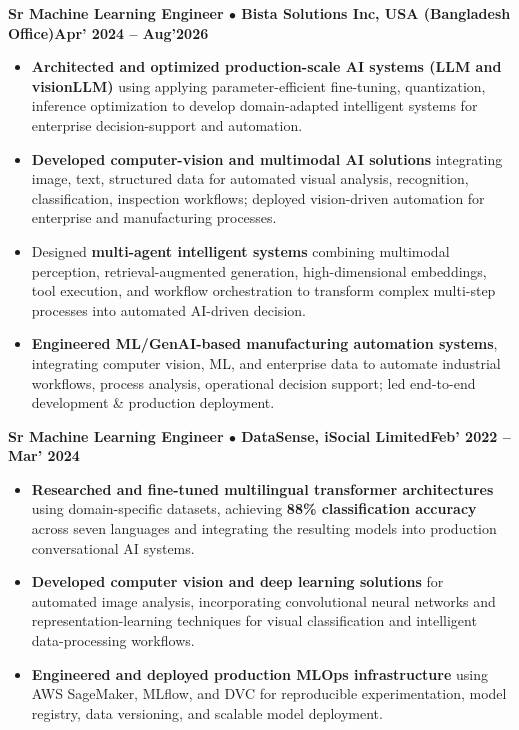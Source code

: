 \documentclass[10pt,letterpaper]{article}
\newcommand{\entry}[2]{\vspace{2pt}\par\noindent\textbf{#1}\hfill\textbf{#2}\par\nopagebreak}
\begin{document}
\entry{Sr Machine Learning Engineer $\bullet$ Bista Solutions Inc, USA (Bangladesh Office)}{Apr' 2024 -- Aug'2026}
\begin{itemize}
  \item \textbf{Architected and optimized production-scale AI systems (LLM and visionLLM)} using applying parameter-efficient fine-tuning, quantization, inference optimization to develop domain-adapted intelligent systems for enterprise decision-support and automation.
  \item \textbf{Developed computer-vision and multimodal AI solutions} integrating image, text, structured data for automated visual analysis, recognition, classification, inspection workflows; deployed vision-driven automation for enterprise and manufacturing processes.
  \item Designed \textbf{multi-agent intelligent systems} combining multimodal perception, retrieval-augmented generation, high-dimensional embeddings, tool execution, and workflow orchestration to transform complex multi-step processes into automated AI-driven decision.
  \item \textbf{Engineered ML/GenAI-based manufacturing automation systems}, integrating computer vision, ML, and enterprise data to automate industrial workflows, process analysis, operational decision support; led end-to-end development \& production deployment.
\end{itemize}

\entry{Sr Machine Learning Engineer $\bullet$ DataSense, iSocial Limited}{Feb' 2022 -- Mar' 2024}
\begin{itemize}
  \item \textbf{Researched and fine-tuned multilingual transformer architectures} using domain-specific datasets, achieving \textbf{88\% classification accuracy} across seven languages and integrating the resulting models into production conversational AI systems.
  \item \textbf{Developed computer vision and deep learning solutions} for automated image analysis, incorporating convolutional neural networks and representation-learning techniques for visual classification and intelligent data-processing workflows.
  \item \textbf{Engineered and deployed production MLOps infrastructure} using AWS SageMaker, MLflow, and DVC for reproducible experimentation, model registry, data versioning, and scalable model deployment.
\end{itemize}
\end{document}
